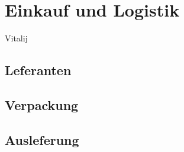 
\section{Einkauf und Logistik}
Vitalij
\subsection{Leferanten}
\subsection{Verpackung}
\subsection{Ausleferung}
